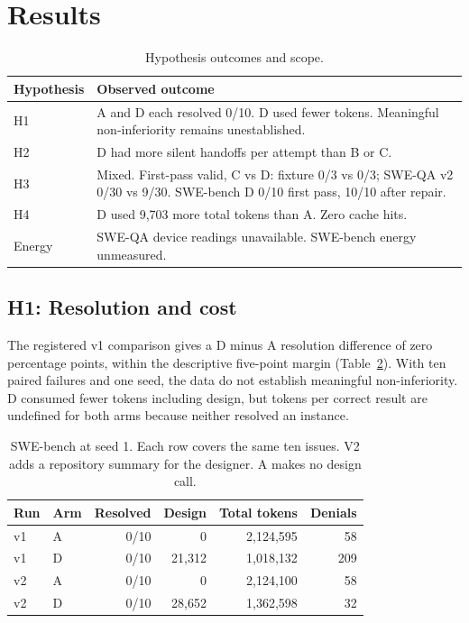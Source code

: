 \documentclass[sigconf,nonacm]{acmart}
\begin{document}
\section{Results}
\begin{table}[t]
\caption{Hypothesis outcomes and scope.}
\label{tab:results}
\centering
\begin{tabularx}{\columnwidth}{lX}
\toprule
Hypothesis & Observed outcome \\
\midrule
H1 & A and D each resolved 0/10. D used fewer tokens. Meaningful non-inferiority remains unestablished. \\
H2 & D had more silent handoffs per attempt than B or C. \\
H3 & Mixed. First-pass valid, C vs D: fixture 0/3 vs 0/3; SWE-QA v2
0/30 vs 9/30. SWE-bench D 0/10 first pass, 10/10 after repair. \\
H4 & D used 9,703 more total tokens than A. Zero cache hits. \\
Energy & SWE-QA device readings unavailable. SWE-bench energy unmeasured. \\
\bottomrule
\end{tabularx}
\end{table}

\subsection{H1: Resolution and cost}
The registered v1 comparison gives a D minus A resolution difference of
zero percentage points, within the descriptive five-point margin
(Table~\ref{tab:swebench}). With ten paired failures and one seed, the
data do not establish meaningful non-inferiority. D consumed fewer tokens
including design, but tokens per correct result are undefined for both
arms because neither resolved an instance.

\begin{table}[t]
\caption{SWE-bench at seed 1. Each row covers the same ten issues.
V2 adds a repository summary for the designer. A makes no design call.}
\label{tab:swebench}
\centering
\setlength{\tabcolsep}{3pt}
\begin{tabular}{llrrrr}
\toprule
Run & Arm & Resolved & Design & Total tokens & Denials \\
\midrule
v1 & A & 0/10 & 0 & 2,124,595 & 58 \\
v1 & D & 0/10 & 21,312 & 1,018,132 & 209 \\
v2 & A & 0/10 & 0 & 2,124,100 & 58 \\
v2 & D & 0/10 & 28,652 & 1,362,598 & 32 \\
\bottomrule
\end{tabular}
\end{table}
\end{document}
